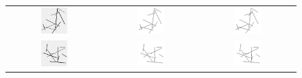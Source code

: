 \documentclass[11pt]{article}
\begin{document}
\begin{figure}
  \begin{tabular}{ccc}
    \includegraphics[width=0.3\textwidth]{Images/randimage1.png}&
    \includegraphics[width=0.3\textwidth]{Images/randold1.png}&
    \includegraphics[width=0.3\textwidth]{Images/randnew1.png} \\
    \includegraphics[width=0.3\textwidth]{Images/randimage2.png}&
    \includegraphics[width=0.3\textwidth]{Images/randold2.png}&
    \includegraphics[width=0.3\textwidth]{Images/randnew2.png}\\




\end{tabular}
\end{figure}
\end{document}
